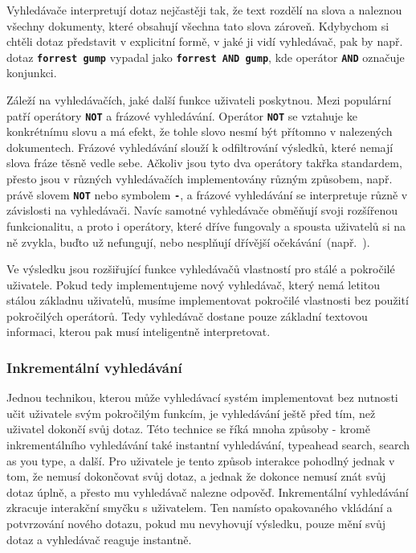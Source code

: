 \documentclass[11pt,letterpaper,oneside,openright]{book}
\newcommand{\bftt}[1]{\texttt{\textbf{#1}}}
\begin{document}

Vyhledávače interpretují dotaz nejčastěji tak, že text rozdělí na slova a
naleznou všechny dokumenty, které obsahují všechna tato slova zároveň.
Kdybychom si chtěli dotaz představit v explicitní formě, v jaké ji vidí
vyhledávač, pak by např. dotaz \bftt{forrest gump} vypadal jako \bftt{forrest
AND gump}, kde operátor \bftt{AND} označuje konjunkci.

Záleží na vyhledávačích, jaké další funkce uživateli poskytnou. Mezi populární
patří operátory \bftt{NOT} a frázové vyhledávání. Operátor \bftt{NOT} se
vztahuje ke konkrétnímu slovu a má efekt, že tohle slovo nesmí být přítomno v
nalezených dokumentech. Frázové vyhledávání slouží k odfiltrování výsledků,
které nemají slova fráze těsně vedle sebe. Ačkoliv jsou tyto dva operátory
takřka standardem, přesto jsou v různých vyhledávačích implementovány různým
způsobem, např. právě slovem \bftt{NOT} nebo symbolem \bftt{-}, a frázové
vyhledávání se interpretuje různě v závislosti na vyhledávači. Navíc samotné
vyhledávače obměňují svoji rozšířenou funkcionalitu, a proto i operátory, které
dříve fungovaly a spousta uživatelů si na ně zvykla, buďto už nefungují, nebo
nesplňují dřívější
očekávání~(např.~\cite{google_operator_kill1,google_operator_kill2}).

Ve výsledku jsou rozšiřující funkce vyhledávačů vlastností pro stálé a
pokročilé uživatele. Pokud tedy implementujeme nový vyhledávač, který nemá
letitou stálou základnu uživatelů, musíme implementovat pokročilé vlastnosti
bez použití pokročilých operátorů. Tedy vyhledávač dostane pouze základní
textovou informaci, kterou pak musí inteligentně interpretovat.

\subsubsection{Inkrementální vyhledávání} \label{sec:inkrementalni_vyhledavani}
Jednou technikou, kterou může vyhledávací systém implementovat bez nutnosti
učit uživatele svým pokročilým funkcím, je vyhledávání ještě před tím, než
uživatel dokončí svůj dotaz. Této technice se říká mnoha způsoby - kromě
inkrementálního vyhledávání také instantní vyhledávání, typeahead search,
search as you type, a další. Pro uživatele je tento způsob interakce pohodlný
jednak v tom, že nemusí dokončovat svůj dotaz, a jednak že dokonce nemusí znát
svůj dotaz úplně, a přesto mu vyhledávač nalezne odpověď. Inkrementální
vyhledávání zkracuje interakční smyčku s uživatelem. Ten namísto opakovaného
vkládání a potvrzování nového dotazu, pokud mu nevyhovují výsledku, pouze mění
svůj dotaz a vyhledávač reaguje instantně.
\end{document}
